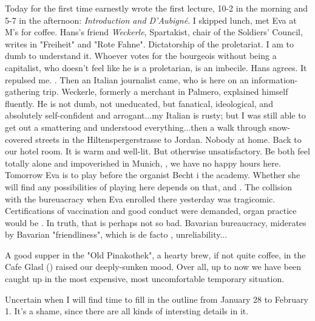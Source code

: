 
Today for the first time earnestly wrote the first lecture, 10-2 in the morning and 5-7 in the afternoon: \textit{Introduction and D'Aubigné}. I skipped lunch, met Eva at M's for coffee. Hans's friend \textit{Weckerle}, Spartakist, chair of the Soldiers' Council, writes in "Freiheit" and "Rote Fahne". Dictatorship of the proletariat. I am to dumb to understand it. Whoever votes for the bourgeois without being a capitalist, who doesn't feel like he is a proletarian, is an imbecile. Hans agrees. It repulsed me. . Then an Italian journalist came, who is here on an information-gathering trip. Weckerle, formerly a merchant in Palmero, explained himself fluently. He is not dumb, not uneducated, but fanatical, ideological, and absolutely self-confident and arrogant...my Italian is rusty; but I was still able to get out a smattering and understood everything...then a walk through snow-covered streets in the Hiltenspergerstrasse to Jordan. Nobody at home. Back to our hotel room. It is warm and well-lit. But otherwise unsatisfactory. Be both feel totally alone and impoverished in Munich, , we have no happy hours here. Tomorrow Eva is to play before the organist Becht i the academy. Whether she will find any possibilities of playing here depends on that, and . The collision with the bureuacracy when Eva enrolled there yesterday was tragicomic. Certifications of vaccination and good conduct were demanded, organ practice would be . In truth, that is perhaps not so bad. Bavarian bureaucracy, miderates by Bavarian "friendliness", which is de facto , unreliability...

A good supper in the "Old Pinakothek", a hearty brew, if not quite coffee, in the Cafe Glasl () raised our deeply-sunken mood. Over all, up to now we have been caught up in the most expensive, most uncomfortable  temporary situation.

Uncertain when I will find time to fill in the outline from January 28 to February 1. It's a shame, since there are all kinds of intersting details in it.

